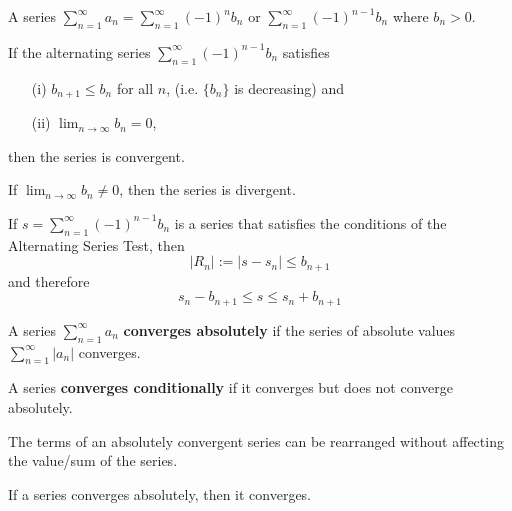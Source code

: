 \begin{definition} A series $\sum_{n=1}^\infty a_n = \sum_{n=1}^\infty (-1)^n b_n \text{ or } \sum_{n=1}^\infty (-1)^{n - 1} b_n$ where $b_n > 0$.
\end{definition}

\begin{theorem} If the alternating series $\sum_{n=1}^\infty (-1)^{n - 1} b_n$ satisfies
  \begin{enumerate}
    \item[(i)] $b_{n + 1} \leq b_n$ for all $n$, (i.e. $\{ b_n \}$ is decreasing) and
    \item[(ii)] $\displaystyle\lim_{n \to \infty} b_n = 0$,
  \end{enumerate}
  then the series is convergent.
\end{theorem}

\begin{theorem} If $\displaystyle\lim_{n \to \infty} b_n \neq 0$, then the series is divergent.
\end{theorem}

\begin{theorem} If $s = \sum_{n=1}^\infty (-1)^{n - 1} b_n$ is a series that satisfies the conditions of the Alternating Series Test, then
  \[
    |R_n| := |s - s_n| \leq b_{n + 1}
  \]
  and therefore
  \[
    s_n - b_{n + 1} \leq s \leq s_n + b_{n + 1}
  \]
\end{theorem}

\begin{definition} A series $\sum_{n = 1}^\infty a_n$ \textbf{converges absolutely} if the series of absolute values $\sum_{n = 1}^\infty |a_n|$ converges.
\end{definition}

\begin{definition} A series \textbf{converges conditionally} if it converges but does not converge absolutely.
\end{definition}

\begin{theorem} The terms of an absolutely convergent series can be rearranged without affecting the value/sum of the series.
\end{theorem}

\begin{theorem} If a series converges absolutely, then it converges.
\end{theorem}

